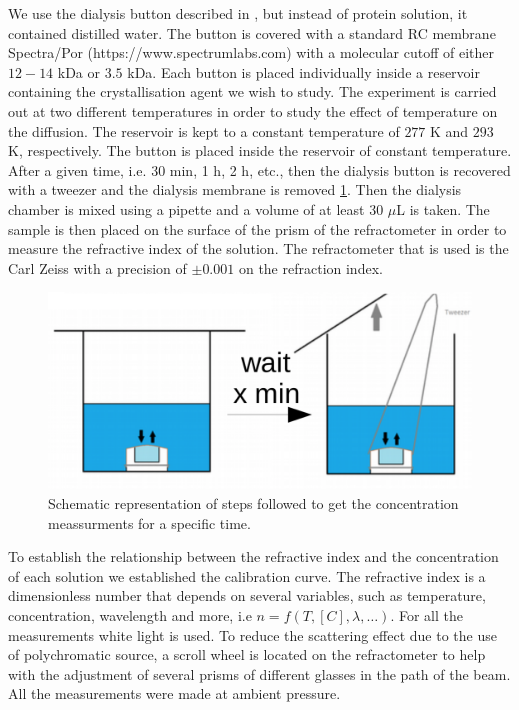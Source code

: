 \documentclass[11ptm,oneside,a4paper]{report}
\begin{document}
We use the dialysis button described in \cite{Junius:ei5002}, but instead of protein solution, it contained distilled water. The 
button is covered with a standard RC membrane Spectra/Por (https://www.spectrumlabs.com) with a molecular cutoff 
of either $12-14$ kDa or $3.5$ kDa. 
Each button is placed individually inside a reservoir containing the crystallisation agent we wish to study.
The experiment is carried out at two different temperatures in order to study the effect of temperature on the diffusion.
The reservoir is kept to a constant temperature of $277$ K and $293$ K, respectively. The button is placed inside the reservoir of 
constant temperature. After a given time, i.e. 30 min, 1 h, 2 h, etc., 
then the dialysis button is recovered with a tweezer and the dialysis membrane is removed \ref{set_up}. 
Then the dialysis chamber is mixed using a pipette and a volume of at least 30 $\mu$L is taken. 
The sample is then placed on the surface of the prism of the refractometer in order to measure the refractive index of the solution. 
The refractometer that is used is the Carl Zeiss with a precision of $\pm 0.001$ on the refraction index.

\begin{figure}[H]
  \begin{center}
      \includegraphics[scale=0.33]{figures/set_up.png}
      \caption{Schematic representation of steps followed to get the concentration 
      meassurments for a specific time. }  
      \label{set_up}
  \end{center} 
\end{figure}
\noindent

To establish the relationship between the refractive index and the concentration of each solution we established the calibration curve. 
The refractive index is a dimensionless number that depends on several variables, 
such as temperature, concentration, wavelength and more, i.e  
$n = f(T, [C], \lambda, \dots)$. For all the measurements white light is used.
To reduce the scattering effect due to the use of polychromatic source, 
a scroll wheel is located on the refractometer to help with the adjustment of several prisms of different glasses in the path of the beam. All the measurements were made at ambient pressure. 
\end{document}
